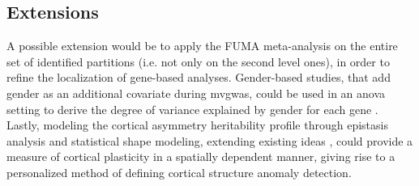 \subsection{Extensions}
A possible extension would be to apply the FUMA meta-analysis on the entire set of identified partitions (i.e. not only on the second level ones), in order to refine the localization of gene-based analyses. Gender-based studies, that add gender as an additional covariate during  \ac{mvgwas}, could be used in an \ac{anova} setting to derive the degree of variance explained by gender for each gene \cite{Rawlik2016}. Lastly, modeling the cortical asymmetry heritability profile through epistasis analysis and statistical shape modeling, extending existing ideas \cite{Filipe2019,Claes2014,White2020}, could provide a measure of cortical plasticity in a spatially dependent manner, giving rise to a personalized method of defining cortical structure anomaly detection.


